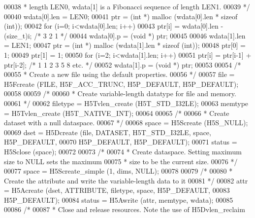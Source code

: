 \begin{DoxyCode}
00038 \textcolor{comment}{     * length LEN0, wdata[1] is a Fibonacci sequence of length LEN1.}
00039 \textcolor{comment}{     */}
00040     wdata[0].len = LEN0;
00041     ptr = (\textcolor{keywordtype}{int} *) malloc (wdata[0].len * \textcolor{keyword}{sizeof} (\textcolor{keywordtype}{int}));
00042     \textcolor{keywordflow}{for} (i=0; i<wdata[0].len; i++)
00043         ptr[i] = wdata[0].len - (\textcolor{keywordtype}{size\_t})i;       \textcolor{comment}{/* 3 2 1 */}
00044     wdata[0].p = (\textcolor{keywordtype}{void} *) ptr;
00045 
00046     wdata[1].len = LEN1;
00047     ptr = (\textcolor{keywordtype}{int} *) malloc (wdata[1].len * \textcolor{keyword}{sizeof} (\textcolor{keywordtype}{int}));
00048     ptr[0] = 1;
00049     ptr[1] = 1;
00050     \textcolor{keywordflow}{for} (i=2; i<wdata[1].len; i++)
00051         ptr[i] = ptr[i-1] + ptr[i-2];   \textcolor{comment}{/* 1 1 2 3 5 8 etc. */}
00052     wdata[1].p = (\textcolor{keywordtype}{void} *) ptr;
00053 
00054     \textcolor{comment}{/*}
00055 \textcolor{comment}{     * Create a new file using the default properties.}
00056 \textcolor{comment}{     */}
00057     file = H5Fcreate (FILE, H5F\_ACC\_TRUNC, H5P\_DEFAULT, H5P\_DEFAULT);
00058 
00059     \textcolor{comment}{/*}
00060 \textcolor{comment}{     * Create variable-length datatype for file and memory.}
00061 \textcolor{comment}{     */}
00062     filetype = H5Tvlen\_create (H5T\_STD\_I32LE);
00063     memtype = H5Tvlen\_create (H5T\_NATIVE\_INT);
00064 
00065     \textcolor{comment}{/*}
00066 \textcolor{comment}{     * Create dataset with a null dataspace.}
00067 \textcolor{comment}{     */}
00068     space = H5Screate (H5S\_NULL);
00069     dset = H5Dcreate (file, DATASET, H5T\_STD\_I32LE, space, H5P\_DEFAULT,
00070                 H5P\_DEFAULT, H5P\_DEFAULT);
00071     status = H5Sclose (space);
00072 
00073     \textcolor{comment}{/*}
00074 \textcolor{comment}{     * Create dataspace.  Setting maximum size to NULL sets the maximum}
00075 \textcolor{comment}{     * size to be the current size.}
00076 \textcolor{comment}{     */}
00077     space = H5Screate\_simple (1, dims, NULL);
00078 
00079     \textcolor{comment}{/*}
00080 \textcolor{comment}{     * Create the attribute and write the variable-length data to it}
00081 \textcolor{comment}{     */}
00082     attr = H5Acreate (dset, ATTRIBUTE, filetype, space, H5P\_DEFAULT,
00083                 H5P\_DEFAULT);
00084     status = H5Awrite (attr, memtype, wdata);
00085 
00086     \textcolor{comment}{/*}
00087 \textcolor{comment}{     * Close and release resources.  Note the use of H5Dvlen\_reclaim}

\end{DoxyCode}
